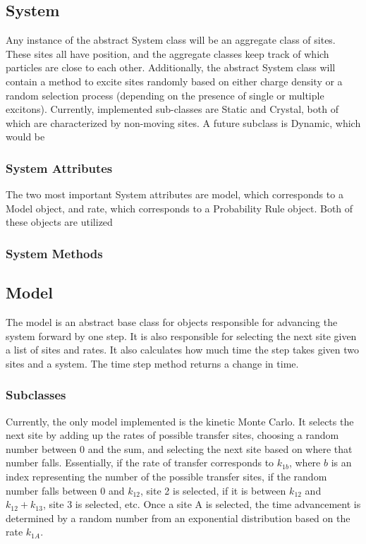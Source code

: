 \documentclass{article}
\begin{document}
\subsection{System}

Any instance of the abstract System class will be an aggregate class of sites. These sites all have position, and the aggregate classes keep track of which particles are close to each other. Additionally, the abstract System class will contain a method to excite sites randomly based on either charge density or a random selection process (depending on the presence of single or multiple excitons). Currently, implemented sub-classes are Static and Crystal, both of which are characterized by non-moving sites. A future subclass is Dynamic, which would be 

\subsubsection{System Attributes}

The two most important System attributes are model, which corresponds to a Model object, and rate, which corresponds to a Probability Rule object. Both of these objects are utilized 

\subsubsection{System Methods}

\subsection{Model}

The model is an abstract base class for objects responsible for advancing the system forward by one step. It is also responsible for selecting the next site given a list of sites and rates. It also calculates how much time the step takes given two sites and a system. The time step method returns a change in time.

\subsubsection{Subclasses}

Currently, the only model implemented is the kinetic Monte Carlo. It selects the next site by adding up the rates of possible transfer sites, choosing a random number between 0 and the sum, and selecting the next site based on where that number falls. Essentially, if the rate of transfer corresponds to $k_{1b}$, where $b$ is an index representing the number of the possible transfer sites, if the random number falls between 0 and $k_{12}$, site 2 is selected, if it is between $k_{12}$ and $k_{12}+k_{13}$, site 3 is selected, etc. Once a site A is selected, the time advancement is determined by a random number from an exponential distribution based on the rate $k_{1A}$.
\end{document}
